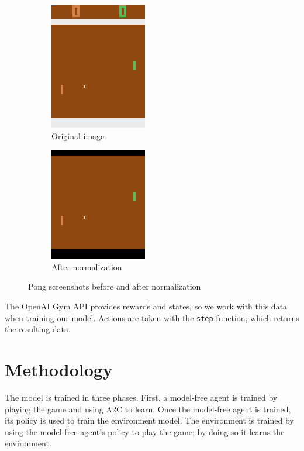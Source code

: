 \documentclass[10pt, twocolumn]{article}
\begin{document}
\begin{figure}[h]
\centering
\begin{subfigure}[b]{.2\textwidth}
  \centering
  \includegraphics[scale=0.5]{unnormalized}
  \caption{Original image}
  \label{fig:unnormalized}
\end{subfigure} 
\begin{subfigure}[b]{.2\textwidth}
  \centering
  \includegraphics[scale=0.5]{normalized}
  \caption{After normalization}
  \label{fig:normalized}
\end{subfigure} \hfill
\caption{Pong screenshots before and after normalization}
\label{screenshots}
\end{figure}

The OpenAI Gym API provides rewards and states, so we work with this data when training our model.
Actions are taken with the \verb|step| function, which returns the resulting data.

\section{Methodology}

The model is trained in three phases. First, a model-free agent is trained by playing the game and using
A2C to learn. Once the model-free agent is trained, its policy is used to train the environment model.
The environment is trained by using the model-free agent's policy to play the game; by doing so it learns the
environment.
\end{document}
